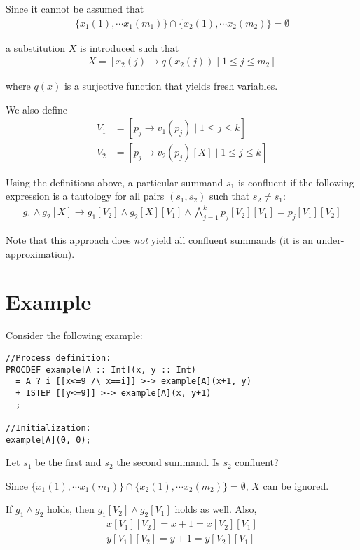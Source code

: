 Since it cannot be assumed that
\begin{align*}
\{ x_1(1), \cdots{} x_1(m_1) \} \cap \{ x_2(1), \cdots{} x_2(m_2) \} = \emptyset{}
\end{align*}

a substitution $X$ is introduced such that
\begin{align*}
X = [ x_2(j) \rightarrow q(x_2(j)) \;|\; 1 \leq j \leq m_2 ]
\end{align*}

where $q(x)$ is a surjective function that yields fresh variables.

We also define
\begin{align*}
V_{1} &= [p_j \rightarrow v_1(p_j) \;|\; 1 \leq j \leq k] \\
V_{2} &= [p_j \rightarrow v_2(p_j)[X] \;|\; 1 \leq j \leq k]
\end{align*}

Using the definitions above, a particular \istep{} summand $s_1$ is confluent if the following expression is a tautology for all pairs $(s_1, s_2)$ such that $s_2 \neq s_1$:
\begin{align*}
g_1 \land g_2[X] \rightarrow g_1[V_2] \land g_2[X][V_1] \land \bigwedge\limits_{j=1}^{k} p_j[V_2][V_1] = p_j[V_1][V_2]
\end{align*}

Note that this approach does \emph{not} yield all confluent \istep{} summands (it is an under-approximation).

\section{Example}

Consider the following example:

\begin{lstlisting}
//Process definition:
PROCDEF example[A :: Int](x, y :: Int)
  = A ? i [[x<=9 /\ x==i]] >-> example[A](x+1, y)
  + ISTEP [[y<=9]] >-> example[A](x, y+1)
  ;

//Initialization:
example[A](0, 0);
\end{lstlisting}

Let $s_1$ be the first and $s_2$ the second summand.
Is $s_2$ confluent?

Since $\{ x_1(1), \cdots{} x_1(m_1) \} \cap \{ x_2(1), \cdots{} x_2(m_2) \} = \emptyset{}$, $X$ can be ignored.

If $g_1 \land g_2$ holds, then $g_1[V_2] \land g_2[V_1]$ holds as well.
Also,
\begin{align*}
x[V_1][V_2] = x+1 = x[V_2][V_1] \\
y[V_1][V_2] = y+1 = y[V_2][V_1]
\end{align*}

